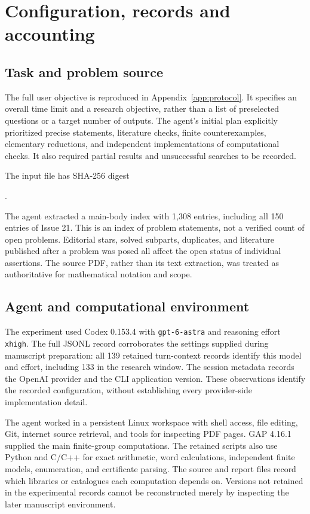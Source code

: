 \section{Configuration, records and accounting}
\label{app:methods}

\subsection{Task and problem source}

The full user objective is reproduced in Appendix~\ref{app:protocol}.
It specifies an overall time limit and a research objective, rather
than a list of preselected questions or a target number of outputs.
The agent's initial plan explicitly prioritized precise statements,
literature checks, finite counterexamples, elementary reductions, and
independent implementations of computational checks. It also required
partial results and unsuccessful searches to be recorded.

The input file  has SHA-256 digest
\begin{center}
\small{}.
\end{center}
The agent extracted a main-body index with 1,308 entries, including
all 150 entries of Issue 21. This is an index of problem statements,
not a verified count of open problems. Editorial stars, solved
subparts, duplicates, and literature published after a problem was
posed all affect the open status of individual assertions.
The source PDF, rather than its text extraction, was treated as
authoritative for mathematical notation and scope.

\subsection{Agent and computational environment}

The experiment used Codex 0.153.4 with \texttt{gpt-6-astra} and
reasoning effort \texttt{xhigh}. The full JSONL record corroborates the
settings supplied during manuscript preparation: all 139 retained
turn-context records identify this model and effort, including 133 in
the research window. The session metadata records the OpenAI provider
and the CLI application version. These observations identify the
recorded configuration, without establishing every provider-side
implementation detail.

The agent worked in a persistent Linux workspace with shell access,
file editing, Git, internet source retrieval, and tools for inspecting
PDF pages. GAP 4.16.1 supplied the main finite-group computations.
The retained scripts also use Python and C/C++ for exact arithmetic,
word calculations, independent finite models, enumeration, and
certificate parsing. The source and report files record which
libraries or catalogues each computation depends on. Versions not
retained in the experimental records cannot be reconstructed merely
by inspecting the later manuscript environment.

